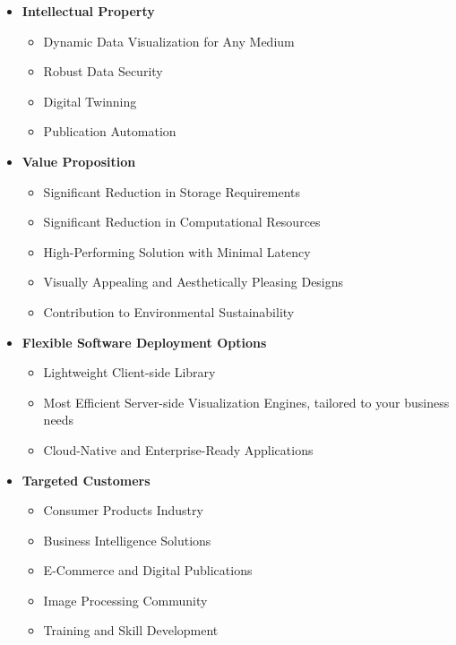 \documentclass{ammTalk}
\begin{document}
\begin{itemize}[itemsep=6mm]\LARGE
\item \textbf{Intellectual Property}
\begin{itemize}\Large
\item Dynamic Data Visualization for Any Medium
\item Robust Data Security
\item Digital Twinning
\item Publication Automation
\end{itemize}
\item \textbf{Value Proposition}
\begin{itemize}\Large
\item Significant Reduction in Storage Requirements
\item Significant Reduction in Computational Resources
\item High-Performing Solution with Minimal Latency
\item Visually Appealing and Aesthetically Pleasing Designs
\item Contribution to Environmental Sustainability
\end{itemize}
\end{itemize}

\begin{itemize}[itemsep=6mm]\LARGE
\item \textbf{Flexible Software Deployment Options}
\begin{itemize}\Large
\item Lightweight Client-side Library
\item Most Efficient Server-side Visualization Engines, tailored to your business needs
\item Cloud-Native and Enterprise-Ready Applications
\end{itemize}
\item \textbf{Targeted Customers}
\begin{itemize}\Large
\item Consumer Products Industry
\item Business Intelligence Solutions
\item E-Commerce and Digital Publications
\item Image Processing Community
\item Training and Skill Development
\end{itemize}
\end{itemize}
\end{document}
